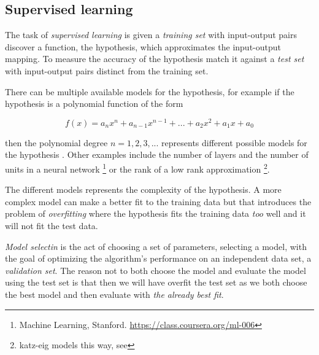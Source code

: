 
\subsection{Supervised learning}\label{sec:background:theory:suplearn}

The task of \textit{supervised learning} is given a \textit{training set} with input-output pairs discover a function, the hypothesis, which approximates the input-output mapping.  To measure the accuracy of the hypothesis match it against a \textit{test set} with input-output pairs distinct from the training set.
\citep{norvigAI}

There can be multiple available models for the hypothesis, for example if the hypothesis is a polynomial function of the form 

\begin{equation}
f(x) = a_n x^n + a_{n - 1} x^{n - 1} + ... + a_2 x^2 + a_1 x + a_0
\end{equation}

then the polynomial degree $n = 1, 2, 3, ...$ represents different possible models for the hypothesis \citep{norvigAI}. Other examples include the number of layers and the number of units in a neural network \footnote{Machine Learning, Stanford. \url{https://class.coursera.org/ml-006}} or the rank of a low rank approximation \footnote{katz-eig models this way, see }.

The different models represents the complexity of the hypothesis. A more complex model can make a better fit to the training data but that introduces the problem of \textit{overfitting} where the hypothesis fits the training data \textit{too} well and it will not fit the test data.
\citep{norvigAI}

\textit{Model selectin} is the act of choosing a set of parameters, selecting a model, with the goal of optimizing the algorithm's performance on an independent data set, a \textit{validation set}.  The reason not to both choose the model and evaluate the model using the test set is that then we will have overfit the test set as we both choose the best model and then evaluate with \textit{the already best fit}. \citep{norvigAI}



